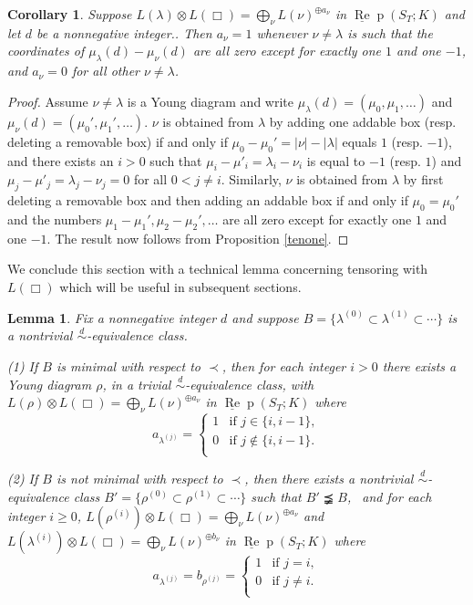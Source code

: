 \documentclass{amsart}
\newtheorem{lemma}[theorem]{Lemma}
\newtheorem{corollary}[theorem]{Corollary}
\theoremstyle{definition}
\def\uRep{\underline{\operatorname{Re}}\!\operatorname{p}}
\renewcommand{\1}{_{(1)}}
\renewcommand{\2}{_{(2)}}
\newcommand{\3}{_{(3)}}
\newcommand{\4}{_{(4)}}
\begin{document}
\begin{corollary}\label{tenonecor}  Suppose $L(\lambda)\otimes L(\Box)=\bigoplus_{\nu}L(\nu)^{\oplus a_\nu}$  in $\uRep(S_T; K)$ and let $d$ be a nonnegative integer..  Then $a_\nu=1$ whenever $\nu\not=\lambda$ is such that the coordinates of $\mu_\lambda(d)-\mu_\nu(d)$ are all zero except for exactly one $1$ and one $-1$, and $a_\nu=0$ for all other $\nu\not=\lambda$.
\end{corollary}

\begin{proof} Assume $\nu\not=\lambda$ is a Young diagram and write $\mu_\lambda(d)=(\mu_0, \mu_1,\ldots)$ and $\mu_\nu(d)=(\mu_0', \mu_1',\ldots)$.   $\nu$ is obtained from $\lambda$ by adding one addable box (resp. deleting a removable box) if and only if $\mu_0-\mu_0'=|\nu|-|\lambda|$ equals $1$ (resp. $-1$), and 
there exists an $i>0$ such that $\mu_i-\mu'_i=\lambda_i-\nu_i$ is equal to $-1$ (resp. $1$) and $\mu_j-\mu'_j=\lambda_j-\nu_j=0$ for all $0<j\not=i$.  Similarly, $\nu$ is obtained from $\lambda$ by first deleting a removable box and then adding an addable box if and only if $\mu_0=\mu_0'$ and the numbers $\mu_1-\mu_1',\mu_2-\mu_2',\ldots$ are all zero except for exactly one $1$ and one $-1$.  The result now follows from Proposition \ref{tenone}.
\end{proof}

We conclude this section with a technical lemma concerning tensoring with $L(\Box)$ which will be useful in subsequent sections.  

\begin{lemma}\label{oneboxlemma} Fix a nonnegative integer $d$ and suppose $B=\{\lambda^{(0)}\subset \lambda^{(1)}\subset\cdots\}$ is a nontrivial $\stackrel{d}{\sim}$-equivalence class.  

(1)  If $B$ is minimal with respect to $\prec$, then for each integer $i>0$ there exists a Young diagram $\rho$, in a trivial $\stackrel{d}{\sim}$-equivalence class, with $L(\rho)\otimes L(\Box)=\bigoplus_{\nu}L(\nu)^{\oplus a_\nu}$ in $\uRep(S_T; K)$ where $$a_{\lambda^{(j)}}=\left\{\begin{array}{ll}
1 & \text{if }j\in\{i, i-1\},\\
0 & \text{if }j\not\in\{i, i-1\}.\\
\end{array}\right.$$

(2) If $B$ is not minimal with respect to $\prec$, then there exists a nontrivial $\stackrel{d}{\sim}$-equivalence class $B'=\{\rho^{(0)}\subset \rho^{(1)}\subset\cdots\}$  such that $B'\precneqq B$,~ and for each integer $i\geq0$, $L(\rho^{(i)})\otimes L(\Box)=\bigoplus_{\nu}L(\nu)^{\oplus a_\nu}$ and $L(\lambda^{(i)})\otimes L(\Box)=\bigoplus_{\nu}L(\nu)^{\oplus b_\nu}$ in $\uRep(S_T; K)$ where $$a_{\lambda^{(j)}}=b_{\rho^{(j)}}=\left\{\begin{array}{ll}
1 & \text{if }j=i,\\
0 & \text{if }j\not=i.\\
\end{array}\right.$$
\end{lemma}
\end{document}
